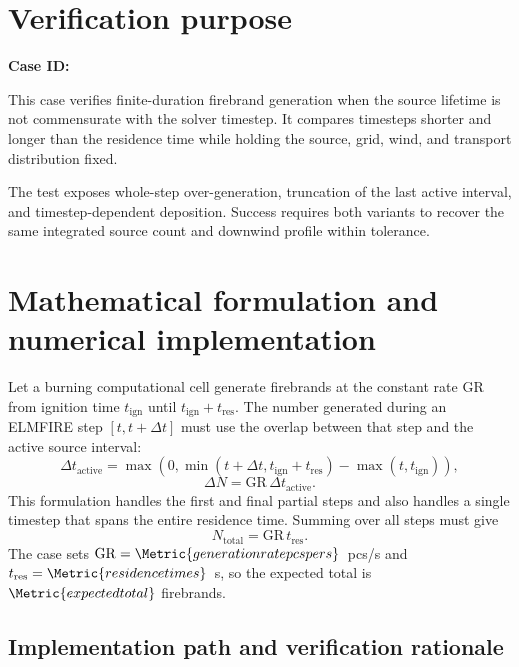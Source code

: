 \section{Verification purpose}

\textbf{Case ID:} \CaseID

This case verifies finite-duration firebrand generation when the source lifetime is not commensurate with the solver timestep. It compares timesteps shorter and longer than the residence time while holding the source, grid, wind, and transport distribution fixed.

The test exposes whole-step over-generation, truncation of the last active interval, and timestep-dependent deposition. Success requires both variants to recover the same integrated source count and downwind profile within tolerance.

\section{Mathematical formulation and numerical implementation}
Let a burning computational cell generate firebrands at the constant rate
$\mathrm{GR}$ from ignition time $t_{\mathrm{ign}}$ until
$t_{\mathrm{ign}}+t_{\mathrm{res}}$. The number generated during an ELMFIRE
step $[t,t+\Delta t]$ must use the overlap between that step and the active
source interval:
\[
  \Delta t_{\mathrm{active}}
  =\max\!\left(0,
    \min(t+\Delta t,t_{\mathrm{ign}}+t_{\mathrm{res}})
    -\max(t,t_{\mathrm{ign}})\right),
\]
\[
  \Delta N=\mathrm{GR}\,\Delta t_{\mathrm{active}}.
\]
This formulation handles the first and final partial steps and also handles a
single timestep that spans the entire residence time. Summing over all steps
must give
\[
  N_{\mathrm{total}}=\mathrm{GR}\,t_{\mathrm{res}}.
\]
The case sets $\mathrm{GR}=\Metric{generationratepcspers}$~pcs/s and
$t_{\mathrm{res}}=\Metric{residencetimes}$~s, so the expected total is
$\Metric{expectedtotal}$ firebrands.

\subsection{Implementation path and verification rationale}

